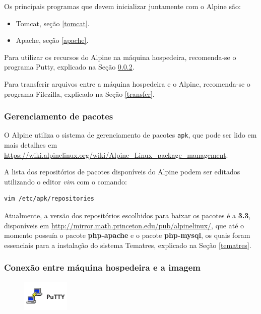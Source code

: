 Os principais programas que devem inicializar juntamente com o Alpine são:

\begin{itemize}
    \item Tomcat, seção \ref{tomcat}.
    \item Apache, seção \ref{apache}.
\end{itemize}

Para utilizar os recursos do Alpine na máquina hospedeira, recomenda-se o programa Putty, explicado na Seção \ref{conexao}.

Para transferir arquivos entre a máquina hospedeira e o Alpine, recomenda-se o programa Filezilla, explicado na Seção \ref{transfer}.

\subsubsection{Gerenciamento de pacotes}

O Alpine utiliza o sistema de gerenciamento de pacotes \lstinline{apk}, que pode ser lido em mais detalhes em \url{https://wiki.alpinelinux.org/wiki/Alpine_Linux_package_management}.

A lista dos repositórios de pacotes disponíveis do Alpine podem ser editados utilizando o editor \textit{vim} com o comando:

\begin{lstlisting}[language=bash]
    vim /etc/apk/repositories
\end{lstlisting}

Atualmente, a versão dos repositórios escolhidos para baixar os pacotes é a \textbf{3.3}, disponíveis em \url{http://mirror.math.princeton.edu/pub/alpinelinux/}, que até o momento possuía o pacote \textbf{php-apache} e o pacote \textbf{php-mysql}, os quais foram essenciais para a instalação do sistema Tematres, explicado na Seção \ref{tematres}.

\subsubsection{Conexão entre máquina hospedeira e a imagem}\label{conexao}

\begin{figure} %
    \centering
    \includegraphics[width=0.2\textwidth]{../images/putty1.png}
\end{figure}

